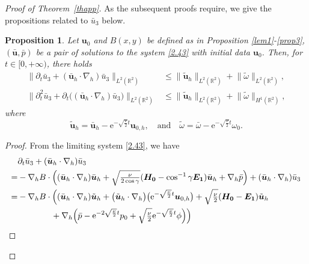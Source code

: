 \documentclass[pdflatex,sn-mathphys-num]{sn-jnl}%
\theoremstyle{thmstyleone}%
\newtheorem{proposition}[theorem]{Proposition}%
\theoremstyle{thmstyletwo}%
\theoremstyle{thmstylethree}%
\theoremstyle{thmstyletwo}
\begin{document}
\begin{proof}[Proof of Theorem~{\upshape\ref{thapp}}]
As the subsequent proofs require, we give the propositions related to $\bar{u}_3$ below.

\begin{proposition}\label{prop4}
	Let ${\boldsymbol{u}}_{0}$ and $B(x,y)$ be defined as in Proposition \ref{lem1}-\ref{prop3}, $(\bar{\boldsymbol u},\bar p)$ be a pair of solutions to the system \eqref{2.43} with initial data $ {\boldsymbol u}_0$. Then, for $t \in [0,+\infty)$, there holds
	\begin{align}
		\lVert
		\partial_t \bar{u}_3+(\bar{\boldsymbol{u}}_h\cdot\nabla_h)\bar{u}_3\rVert_{{L}^{2}(\mathbb{R}^2)}&\leq
		\lVert\tilde{\boldsymbol{u}}_h\rVert_{L^2(\mathbb{R}^2)}
		+\lVert\tilde{\omega}\rVert_{L^2(\mathbb{R}^2)},\label{n13}\\
		\lVert
		\partial^2_t \bar{u}_3+\partial_t\big((\bar{\boldsymbol{u}}_h\cdot\nabla_h)\bar{u}_3\big)\rVert_{{L}^{2}(\mathbb{R}^2)} &\leq
		\lVert\tilde{\boldsymbol{u}}_h\rVert_{L^2(\mathbb{R}^2)}
		+\lVert\tilde{\omega}\rVert_{H^1(\mathbb{R}^2)}
		,\label{n14}
	\end{align}
	where 
	\begin{equation}\label{tildeu}
		\tilde{\boldsymbol{u}}_h=\bar {\boldsymbol u}_h-\mathrm{e}^{-\sqrt{\frac\nu2}t}{\boldsymbol{u}}_{0,h}, \quad \text{and} \quad
		\tilde{\omega}=\bar{\omega}-\mathrm{e}^{-\sqrt{\frac\nu2}t}\omega_0.
	\end{equation}
\end{proposition}
\begin{proof}
	From the limiting system \eqref{2.43}, we have 
	\begin{align}\label{n1}
		&\partial_t \bar{u}_3+(\bar{\boldsymbol{u}}_h\cdot\nabla_h)\bar{u}_3\notag\\
		=&-\nabla_{h}B\cdot\Big(
		(\bar {\boldsymbol u}_h \cdot \nabla_h) \bar {\boldsymbol u}_h+\sqrt{\tfrac{\nu}{2\cos\gamma}}
		(\boldsymbol{H_0}
		-\cos^{-1}\gamma\boldsymbol{E_1})
		\bar{\boldsymbol u}_h +\nabla_{ h}\bar{p}
		\Big)+(\bar{\boldsymbol{u}}_h\cdot\nabla_h)\bar{u}_3\notag\\
		=&-\nabla_{h}B\cdot\Big(
		(\bar {\boldsymbol u}_h \cdot \nabla_h) \tilde{\boldsymbol{u}}_h+\big(\tilde{\boldsymbol{u}}_h\cdot  \nabla_h\big)\big(\mathrm{e}^{-\sqrt{\frac\nu2}t}{\boldsymbol{u}}_{0,h}\big)+\sqrt{\tfrac{\nu}{2}}
		(\boldsymbol{H_0}
		-\boldsymbol{E_1})
		\tilde{\boldsymbol{u}}_h\notag\\
		&\qquad\qquad
		+\nabla_{ h}\Big(\bar{p}-\mathrm{e}^{-2\sqrt{\frac\nu2}t}p_0+\sqrt{\tfrac\nu2}\mathrm{e}^{-\sqrt{\frac\nu2}t}\phi\Big)
		\Big)\notag\\

\end{align}
\end{proof}
\end{proof}
\end{document}
